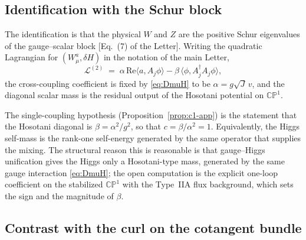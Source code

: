 \documentclass[aps,prd,onecolumn,superscriptaddress,nofootinbib,reprint]{revtex4-2}
\newcommand{\CP}{\mathbb{CP}}
\begin{document}
\subsection{Identification with the Schur block}

The identification is that the physical $W$ and $Z$ are the positive
Schur eigenvalues of the gauge--scalar block [Eq.~(7) of the Letter].
Writing the quadratic Lagrangian for $(W_{\mu}^{a},\delta H)$ in the
notation of the main Letter,
\begin{equation}
  \mathcal{L}^{(2)}\;=\;\alpha\,\mathrm{Re}\langle a,A_{j}\phi\rangle
  -\beta\,\langle\phi,A_{j}^{\dagger}A_{j}\phi\rangle,
\label{eq:Lalphabeta}
\end{equation}
the cross-coupling coefficient is fixed by \eqref{eq:DmuH} to be
$\alpha=g\sqrt{J}\,v$, and the diagonal scalar mass is the residual
output of the Hosotani potential on $\CP^{1}$.

The single-coupling hypothesis (Proposition~\ref{prop:c1-app}) is the
statement that the Hosotani diagonal is $\beta=\alpha^{2}/g^{2}$, so
that $c=\beta/\alpha^{2}=1$.  Equivalently, the Higgs self-mass is
the rank-one self-energy generated by the same operator that supplies
the mixing.  The structural reason this is reasonable is that
gauge--Higgs unification gives the Higgs only a Hosotani-type mass,
generated by the same gauge interaction \eqref{eq:DmuH}; the open
computation is the explicit one-loop coefficient on the stabilized
$\CP^{1}$ with the Type~IIA flux background, which sets the sign and
the magnitude of $\beta$.


\subsection{Contrast with the curl on the cotangent bundle}
\end{document}

